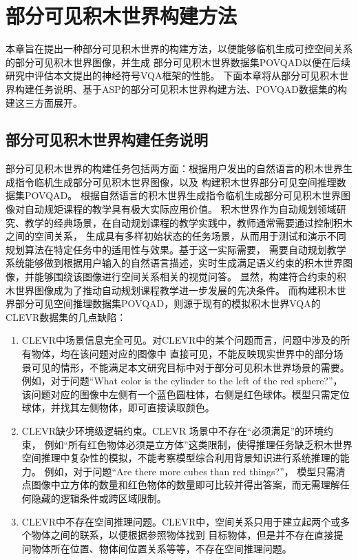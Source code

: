 \chapter{部分可见积木世界构建方法}
\label{dataset}
本章旨在提出一种部分可见积木世界的构建方法，以便能够临机生成可控空间关系的部分可见积木世界图像，并生成
部分可见积木世界数据集POVQAD以便在后续研究中评估本文提出的神经符号VQA框架的性能。
下面本章将从部分可见积木世界构建任务说明、基于ASP的部分可见积木世界构建方法、POVQAD数据集的构建这三方面展开。
\section{部分可见积木世界构建任务说明}
部分可见积木世界的构建任务包括两方面：根据用户发出的自然语言的积木世界生成指令临机生成部分可见积木世界图像，以及
构建积木世界部分可见空间推理数据集POVQAD。
根据自然语言的积木世界生成指令临机生成部分可见积木世界图像对自动规矩课程的教学具有极大实际应用价值。
积木世界作为自动规划领域研究、教学的经典场景，在自动规划课程的教学实践中，教师通常需要通过控制积木之间的空间关系，
生成具有多样初始状态的任务场景，从而用于测试和演示不同规划算法在特定任务中的适用性与效果。基于这一实际需要，
需要自动规划教学系统能够做到根据用户输入的自然语言描述，实时生成满足语义约束的积木世界图像，并能够围绕该图像进行空间关系相关的视觉问答。
显然，构建符合约束的积木世界图像成为了推动自动规划课程教学进一步发展的先决条件。
而构建积木世界部分可见空间推理数据集POVQAD，则源于现有的模拟积木世界VQA的CLEVR数据集的几点缺陷：
\begin{enumerate}[nosep]
\item CLEVR中场景信息完全可见。对CLEVR中的某个问题而言，问题中涉及的所有物体，均在该问题对应的图像中
直接可见，不能反映现实世界中的部分场景可见的情形，不能满足本文研究目标中对于部分可见积木世界场景的需要。
例如，对于问题“What color is the cylinder to the left of the red sphere?”，
该问题对应的图像中左侧有一个蓝色圆柱体，右侧是红色球体。模型只需定位球体，并找其左侧物体，即可直接读取颜色。
\item CLEVR缺少环境级逻辑约束。CLEVR 场景中不存在“必须满足”的环境约束，
例如“所有红色物体必须是立方体”这类限制，使得推理任务缺乏积木世界空间推理中复杂性的模拟，不能考察模型综合利用背景知识进行系统推理的能力。
例如，对于问题“Are there more cubes than red things?”，
模型只需清点图像中立方体的数量和红色物体的数量即可比较并得出答案，而无需理解任何隐藏的逻辑条件或跨区域限制。
\item CLEVR中不存在空间推理问题。CLEVR中，空间关系只用于建立起两个或多个物体之间的联系，以便根据参照物体找到
目标物体，但是并不存在直接提问物体所在位置、物体间位置关系等等，不存在空间推理问题。
\end{enumerate}

